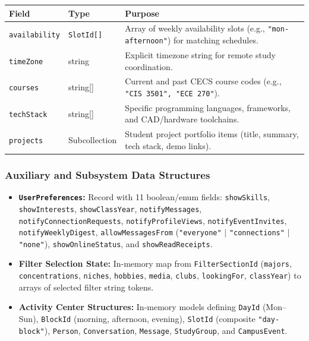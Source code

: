\documentclass[11pt,letterpaper]{article}
\begin{document}
\begin{table}[h!]
\centering
\small
\begin{tabularx}{\textwidth}{p{3.2cm} p{2.2cm} Y}
\toprule
\textbf{Field} & \textbf{Type} & \textbf{Purpose} \\
\midrule
\texttt{availability} & \texttt{SlotId[]} & Array of weekly availability slots (e.g., \texttt{"mon-afternoon"}) for matching schedules. \\
\texttt{timeZone} & string & Explicit timezone string for remote study coordination. \\
\texttt{courses} & string[] & Current and past CECS course codes (e.g., \texttt{"CIS 3501", "ECE 270"}). \\
\texttt{techStack} & string[] & Specific programming languages, frameworks, and CAD/hardware toolchains. \\
\texttt{projects} & Subcollection & Student project portfolio items (title, summary, tech stack, demo links). \\
\bottomrule
\end{tabularx}
\end{table}

\subsubsection*{Auxiliary and Subsystem Data Structures}
\begin{itemize}[leftmargin=*,itemsep=2pt]
\item \textbf{\texttt{UserPreferences}:} Record with 11 boolean/enum fields: \texttt{showSkills}, \texttt{showInterests}, \texttt{showClassYear}, \texttt{notifyMessages}, \texttt{notifyConnectionRequests}, \texttt{notifyProfileViews}, \texttt{notifyEventInvites}, \texttt{notifyWeeklyDigest}, \texttt{allowMessagesFrom} (\texttt{"everyone"} $|$ \texttt{"connections"} $|$ \texttt{"none"}), \texttt{showOnlineStatus}, and \texttt{showReadReceipts}.
\item \textbf{Filter Selection State:} In-memory map from \texttt{FilterSectionId} (\texttt{majors}, \texttt{concentrations}, \texttt{niches}, \texttt{hobbies}, \texttt{media}, \texttt{clubs}, \texttt{lookingFor}, \texttt{classYear}) to arrays of selected filter string tokens.
\item \textbf{Activity Center Structures:} In-memory models defining \texttt{DayId} (Mon--Sun), \texttt{BlockId} (morning, afternoon, evening), \texttt{SlotId} (composite \texttt{"day-block"}), \texttt{Person}, \texttt{Conversation}, \texttt{Message}, \texttt{StudyGroup}, and \texttt{CampusEvent}.
\end{itemize}
\end{document}

